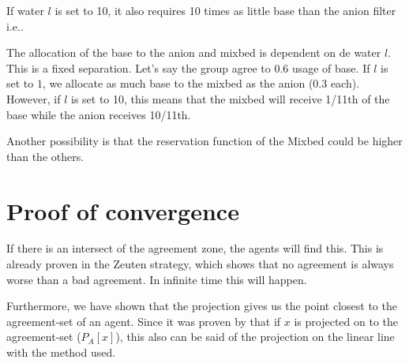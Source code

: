 If water $l$ is set to 10, it also requires 10 times as little base than the anion filter i.e..

The allocation of the base to the anion and mixbed is dependent on de water $l$. This is a fixed separation. Let's say the group agree to 0.6 usage of base. If $l$ is set to $1$, we allocate as much base to the mixbed as the anion (0.3 each). However, if $l$ is set to 10, this means that the mixbed will receive 1/11th of the base while the anion receives 10/11th. 

Another possibility is that the reservation function of the Mixbed could be higher than the others. 


\section{Proof of convergence}
If there is an intersect of the agreement zone, the agents will find this.
This is already proven in the Zeuten strategy, which shows that no agreement is always worse than a bad agreement. In infinite time this will happen. 

Furthermore, we have shown that the projection gives us the point closest to the agreement-set of an agent. Since it was proven by \citet{zheng2015automated} that if $x$ is projected on to the agreement-set  ($P_A[x]$), this also can be said of the projection on the linear line with the method used. 

%
%



